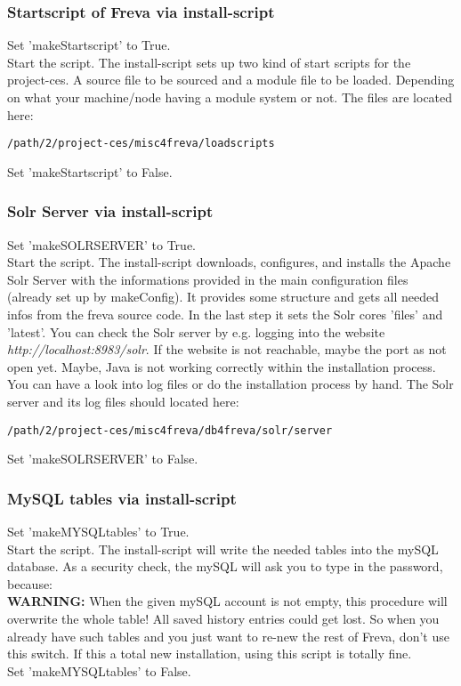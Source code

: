 \documentclass[a4paper,11pt]{ltxdoc}
\begin{document}
\subsubsection{Startscript of Freva via install-script}
Set 'makeStartscript' to True. \\
Start the script. The install-script sets up two kind of start scripts for the project-ces. A source file to be sourced and a module file to be loaded. Depending on what your machine/node having a module system or not. The files are located here:
\begin{lstlisting}
/path/2/project-ces/misc4freva/loadscripts \end{lstlisting}
Set 'makeStartscript' to False.
\subsubsection{Solr Server via install-script}
Set 'makeSOLRSERVER' to True. \\
Start the script. The install-script downloads, configures, and installs the Apache Solr Server with the informations provided in the main configuration files (already set up by makeConfig). It provides some structure and gets all needed infos from the freva source code. In the last step it sets the Solr cores 'files' and 'latest'. You can check the Solr server by e.g. logging into the website \textit{http://localhost:8983/solr}. If the website is not reachable, maybe the port as not open yet. Maybe, Java is not working correctly within the installation process. You can have a look into log files or do the installation process by hand. The Solr server and its log files should located here:
\begin{lstlisting}
/path/2/project-ces/misc4freva/db4freva/solr/server \end{lstlisting}
Set 'makeSOLRSERVER' to False.
\subsubsection{MySQL tables via install-script}
Set 'makeMYSQLtables' to True. \\
Start the script. The install-script will write the needed tables into the mySQL database. As a security check, the mySQL will ask you to type in the password, because: \\
\textbf{WARNING:} When the given mySQL account is not empty, this procedure will overwrite the whole table! All saved history entries could get lost. So when you already have such tables and you just want to re-new the rest of Freva, don't use this switch. If this a total new installation, using this script is totally fine. \\
Set 'makeMYSQLtables' to False.
\end{document}

